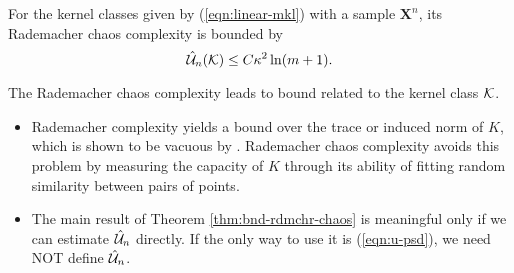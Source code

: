\begin{theorem} \label{thm:u-mkl}
For the kernel classes given by (\ref{eqn:linear-mkl}) with a sample $\mathbf X^n$,
its Rademacher chaos complexity is bounded by
\[
{\hat{{\cal U}}_n}({\cal K}) \leq C\kappa^2\ln(m + 1).
\]
\end{theorem}


\begin{remark} \label{rmk:rdmchr-chaos}
The Rademacher chaos complexity leads to bound related to the kernel
class ${\cal K}$.
\begin{itemize}
  \item Rademacher complexity yields a bound over the trace or induced norm of $K$,
   which is shown to be vacuous by \cite{colt/SrebroB06}. Rademacher chaos
   complexity avoids this problem by measuring the capacity of $K$ through its
   ability of fitting random similarity between pairs of points.
  \item The main result of Theorem \ref{thm:bnd-rdmchr-chaos} is meaningful only if we can
    estimate ${\hat{{\cal U}}_n}$ directly. If the only way to use it is (\ref{eqn:u-psd}), we need
    NOT define ${\hat{{\cal U}}_n}$.
\end{itemize}
\end{remark} 

